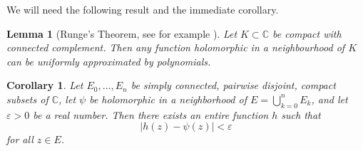 \documentclass[a4paper, 12pt, twoside]{amsart}
\newtheorem{cor}[thm]{Corollary}
\newtheorem{lem}[thm]{Lemma}
\theoremstyle{definition}
\numberwithin{equation}{section}
\newcommand{\C}{{\mathbb C}}
\renewcommand{\epsilon}{\varepsilon}
\begin{document}
We will need the following result and the immediate corollary.

\begin{lem}[Runge's Theorem, see for example {\cite[p. 459]{Eremenko_Ljubich_1987}}]\label{Lemma:Runge:Gen}
    Let $K \subset \C$ be compact with connected complement. Then any function holomorphic  in a neighbourhood of $K$ can be uniformly approximated by polynomials.
\end{lem}

\begin{cor}\label{Lemma:Runge}
    Let $E_0, \dots, E_n$ be simply connected, pairwise disjoint, compact subsets of $\C$, let $\psi$ be holomorphic in a neighborhood of  $E = \bigcup_{k=0}^{n} E_k$, and let $\epsilon> 0$ be a real number.
    Then there exists an entire function $h$ such that
	\begin{equation*}
		|h(z) - \psi(z)| < \epsilon
	\end{equation*}
	for all $z \in E$.
\end{cor}
\end{document}
